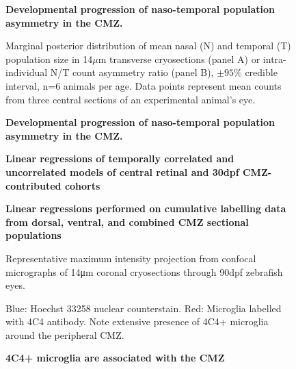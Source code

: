 \begin{figure}[!h]
    \caption{{\bf Developmental progression of naso-temporal population asymmetry in the CMZ.}}
    \label{morphology}
\end{figure}

\begin{figure}[!h]
    \caption{{\bf Developmental progression of naso-temporal population asymmetry in the CMZ.}}
    Marginal posterior distribution of mean nasal (N) and temporal (T) population size in 14$\mu$m transverse cryosections (panel A) or intra-individual N/T count asymmetry ratio (panel B), $\pm 95\%$ credible interval, n=6 animals per age. Data points represent mean counts from three central sections of an experimental animal's eye. 
    \label{NTontology}
\end{figure}


\begin{figure}[!h]
    \caption{{\bf Linear regressions of temporally correlated and uncorrelated models of central retinal and 30dpf CMZ-contributed cohorts}}
    \label{a27linreg}
\end{figure}


\begin{figure}[!h]
    \caption{{\bf Linear regressions performed on cumulative labelling data from dorsal, ventral, and combined CMZ sectional populations}}
    \label{cumEdUlinreg}
\end{figure}


\begin{figure}[!h]
    \caption{{\bf 4C4+ microglia are associated with the CMZ}}
    Representative maximum intensity projection from confocal micrographs of 14\si{\micro\metre} coronal cryosections through 90dpf zebrafish eyes.
    
    Blue: Hoechst 33258 nuclear counterstain. Red: Microglia labelled with 4C4 antibody. Note extensive presence of 4C4+ microglia around the peripheral CMZ.
    \label{4C4micrograph}
\end{figure}

\FloatBarrier

